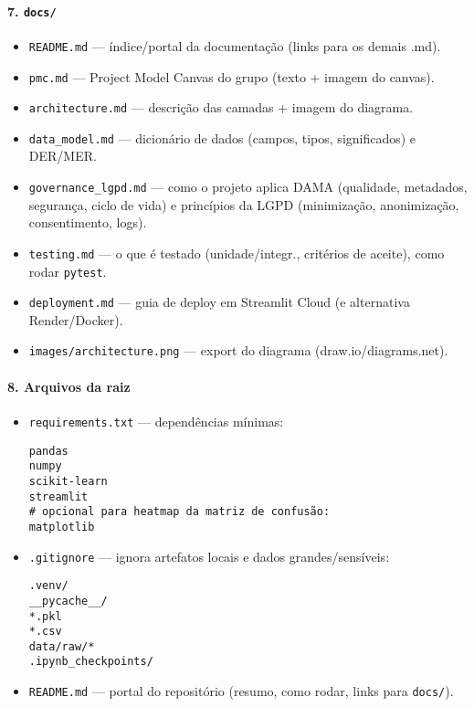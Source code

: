\documentclass[12pt,a4paper]{article}
\begin{document}
\paragraph{7. \texttt{docs/}}
\begin{itemize}
  \item \texttt{README.md} --- índice/portal da documentação (links para os demais .md).
  \item \texttt{pmc.md} --- Project Model Canvas do grupo (texto + imagem do canvas).
  \item \texttt{architecture.md} --- descrição das camadas + imagem do diagrama.
  \item \texttt{data\_model.md} --- dicionário de dados (campos, tipos, significados) e DER/MER.
  \item \texttt{governance\_lgpd.md} --- como o projeto aplica DAMA (qualidade, metadados, segurança, ciclo de vida) e princípios da LGPD (minimização, anonimização, consentimento, logs).
  \item \texttt{testing.md} --- o que é testado (unidade/integr., critérios de aceite), como rodar \texttt{pytest}.
  \item \texttt{deployment.md} --- guia de deploy em Streamlit Cloud (e alternativa Render/Docker).
  \item \texttt{images/architecture.png} --- export do diagrama (draw.io/diagrams.net).
\end{itemize}

\paragraph{8. Arquivos da raiz}
\begin{itemize}
  \item \texttt{requirements.txt} --- dependências mínimas:
\begin{lstlisting}
pandas
numpy
scikit-learn
streamlit
# opcional para heatmap da matriz de confusão:
matplotlib
\end{lstlisting}
  \item \texttt{.gitignore} --- ignora artefatos locais e dados grandes/sensíveis:
\begin{lstlisting}
.venv/
__pycache__/
*.pkl
*.csv
data/raw/*
.ipynb_checkpoints/
\end{lstlisting}
  \item \texttt{README.md} --- portal do repositório (resumo, como rodar, links para \texttt{docs/}).
\end{itemize}
\end{document}
